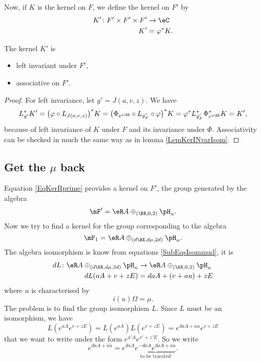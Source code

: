 Now, if $K$ is the kernel on $F$, we define the kernel on $F'$ by
\begin{equation}\label{EqKerRprime}
\begin{aligned}
 K'\colon F'\times F'\times F'&\to \eC\\
K'&=\varphi^*K. 
\end{aligned}
\end{equation}


\begin{theorem} 
The kernel $K'$ is
\begin{itemize}
\item left invariant under $F'$,
\item associative on $F'$.
\end{itemize}
 \label{ThoDefoHeizAvecB}
\end{theorem}
\begin{proof}
For left invariance, let $g'=J(a,v,z)$. We have
\[ 
  L_{g'}^*K'=\big( \varphi\circ L_{J(a,v,z)} \big)^*K=\big( \Phi_{ e^{a\BX}}\circ L_{g'_F}\circ\varphi \big)^*K=\varphi^*L_{g'_F}^*\Phi_{ e^{a\BX}}^*K=K',
\]
because of left invariance of $K$ under $F$ and its invariance under $\Phi$. Associativity can be checked in much the same way as in lemma \ref{LemKerINvarIsom}.
\end{proof}

\subsection{Get the \texorpdfstring{$\mu$}{u} back}  \label{SubSecRemetreMu}

Equation \eqref{EqKerRprime} provides a kernel on $F'$, the group generated by the algebra
\[ 
  \mF'=\eR A\oplus_{(\BX ,0,2)}\pH_{n}.
\]
Now we try to find a kernel for the group corresponding to the algebra 
\[ 
  \mF_{1}=\eR A\oplus_{(d\BX ,d\mu,2d)}\pH_{n}.
\]
The algebra isomorphism is know from equations \eqref{SubEqsIsommud}, it is
\begin{equation}
\begin{aligned}
 dL\colon \eR A\oplus_{(d\BX ,d\mu,2d)}\pH_{n}&\to \eR A\oplus_{(\BX ,0,2)}\pH_{n} \\ 
dL(aA+v+zE)&=daA+(v+au)+zE 
\end{aligned}
\end{equation}
where $u$ is characterised by
\[ 
  i(u)\Omega=\mu.
\]
The problem is to find the group isomorphism $L$. Since $L$ must be an isomorphism, we have
\[ 
L( e^{aA} e^{v+zE})=L( e^{aA})L( e^{v+zE})
        = e^{daA+au} e^{v+zE}
\]
that we want to write under the form $ e^{a'A} e^{v'+z'E}$. So we write
\[ 
   e^{daA+au}= e^{daA}\underbrace{e^{-daA} e^{daA+au}}_{\text{to be traeated}}.
\]


